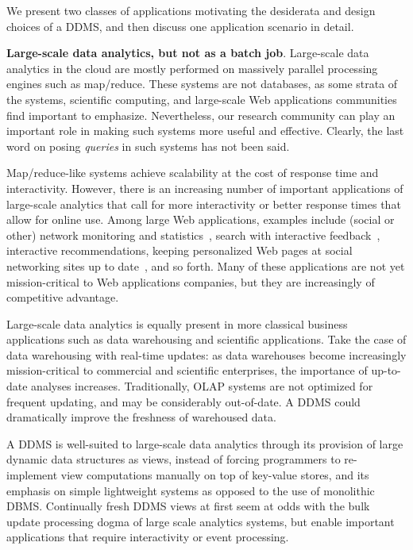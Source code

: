 
\medskip

We present two classes of applications motivating the de\-si\-derata and
design choices of a DDMS, and then discuss one application scenario in detail.

{\bf Large-scale data analytics, but not as a batch job}\/.
%
Large-scale data analytics in the cloud are mostly performed on massively
parallel processing engines such as map/reduce. These systems are not databases,
as some strata of the systems, scientific computing, and large-scale Web
applications communities find important to emphasize. Nevertheless, our research
community can play an important role in making such systems more useful and
effective. Clearly, the last word on posing {\em queries}\/ in such systems
has not been said.

Map/reduce-like systems achieve scalability at the cost of response time and
interactivity.
However, there is an increasing number of important applications of large-scale
analytics that call for more interactivity or better response times that allow
for online use. Among large Web applications, examples include (social or other)
network monitoring and statistics~\cite{olston-cidr:09}, search with interactive
feedback~\cite{bast-cidr:07}, interactive recommendations, keeping personalized
Web pages at social networking sites up to date~\cite{fu-sigmod:10}, and so
forth.
Many of these applications are not yet mission-critical to Web applications
companies, but they are increasingly of competitive advantage.

Large-scale data analytics is equally present in more classical business
applications such as data warehousing and scientific applications. Take the
case of data warehousing with real-time updates: as data warehouses become
increasingly mission-critical to commercial and scientific enterprises, the
importance of up-to-date analyses increases. Traditionally, OLAP systems are not
optimized for frequent updating, and may be considerably out-of-date. A DDMS 
could dramatically improve the freshness of warehoused data.

A DDMS is well-suited to large-scale data analytics through its provision of
large dynamic data structures as views, instead of forcing programmers to
re-implement view computations manually on top of key-value stores, and its
emphasis on simple lightweight systems as opposed to the use of monolithic DBMS.
Continually fresh DDMS views at first seem at odds with the bulk update
processing dogma of large scale analytics systems, but enable important
applications that require interactivity or event processing.


